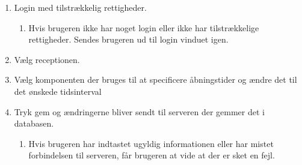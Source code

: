 \begin{enumerate}
    \item Login med tilstrækkelig rettigheder.
  \begin{enumerate}
    \item Hvis brugeren ikke har noget login eller ikke har tilstrækkelige rettigheder. Sendes brugeren ud til login vinduet igen.
  \end{enumerate}
    \item Vælg receptionen.
    \item Vælg komponenten der bruges til at specificere åbningstider og ændre det til det ønskede tidsinterval
    \item Tryk gem og ændringerne bliver sendt til serveren der gemmer det i databasen.
  \begin{enumerate}
    \item Hvis brugeren har indtastet ugyldig informationen eller har mistet forbindelsen til serveren, får brugeren at vide at der er sket en fejl.
  \end{enumerate}
\end{enumerate}